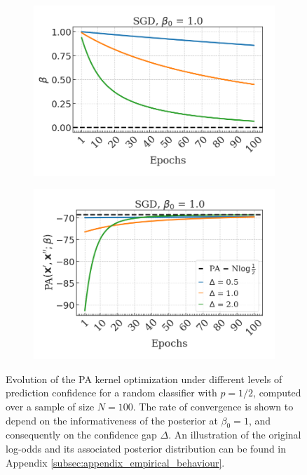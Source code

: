 \begin{figure}[t]
    \centering
    \begin{subfigure}[b]{0.45\textwidth}
        \centering
        \includegraphics[width=\textwidth]{img/results_discussion/empirical/nonrob_met=betas_hue=ldiff.png}
    \end{subfigure}
    \hfill
    \begin{subfigure}[b]{0.45\textwidth}
        \centering
        \includegraphics[width=\textwidth]{img/results_discussion/empirical/nonrob_met=logPA_hue=ldiff.png}
    \end{subfigure}
    \caption{Evolution of the PA kernel optimization under different levels of prediction 
    confidence for a random classifier with $p = 1/2$, computed over a sample of size $N=100$. 
    The rate of convergence is shown to depend on the informativeness of the posterior at $\beta_0 = 1$, and 
    consequently on the confidence gap $\Delta$. 
    An illustration of the original log-odds and 
    its associated posterior distribution can be found in Appendix \ref{subsec:appendix_empirical_behaviour}.
    }
    \label{fig:prediction_confidence}
\end{figure}

